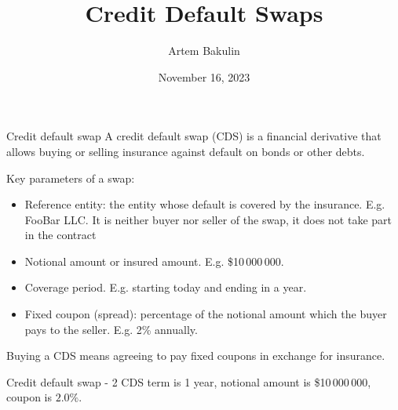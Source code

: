 \documentclass{beamer}
\title{Credit Default Swaps}
\author{Artem Bakulin}
\date{November 16, 2023}
\newcommand{\inserttitleframe}{
		\begin{frame}
		\titlepage
		\end{frame}
	}
\begin{document}
\inserttitleframe

\begin{frame}{Credit default swap}
\justify
A \alert{credit default swap (CDS)} is a financial derivative that allows buying or selling insurance against default on bonds or other debts.

\justify
Key parameters of a swap:
\begin{itemize}
\justifying
\item Reference entity: the entity whose default is covered by the insurance. E.g. FooBar LLC. It is neither buyer nor seller of the swap, it does not take part in the contract
\item Notional amount or insured amount. E.g. \$10\,000\,000.
\item Coverage period. E.g. starting today and ending in a year.
\item Fixed coupon (spread): percentage of the notional amount which the buyer pays to the seller. E.g. 2\% annually.
\end{itemize}

\justify
Buying a CDS means agreeing to pay fixed coupons in exchange for insurance. 
\end{frame}



\newcommand{\swapPartyNode}[5]{

	\draw (#1, #2)
		node[
			rectangle,
			draw,
			rounded corners,
			anchor = south,
			minimum height = 0.8cm,
			minimum width = 2.5cm
		]
		{#5}
	--
	(#3, #4);
}

\newcommand{\swapBuyerPaymentEx}[7]{

	\draw [
		->,
		>=triangle 90
	] 
	(#1, #2)
	node[
		label = left:{#7}
	]{}
	-- (#3, #4)
	node[
		pos=0.5,
		anchor=south
	]
	{#5}
	node[
		pos=0.5,
		anchor=north
	]
	{#6};
}

\newcommand{\swapBuyerPayment}[6]{

	\swapBuyerPaymentEx{#1}{#2}{#3}{#4}{#5}{}{#6}
}

\begin{frame}{Credit default swap - 2}
\justify
CDS term is 1 year, notional amount is \$10\,000\,000, coupon is $2.0\%$.

\justify
\centering
{}
\end{frame}
\end{document}
